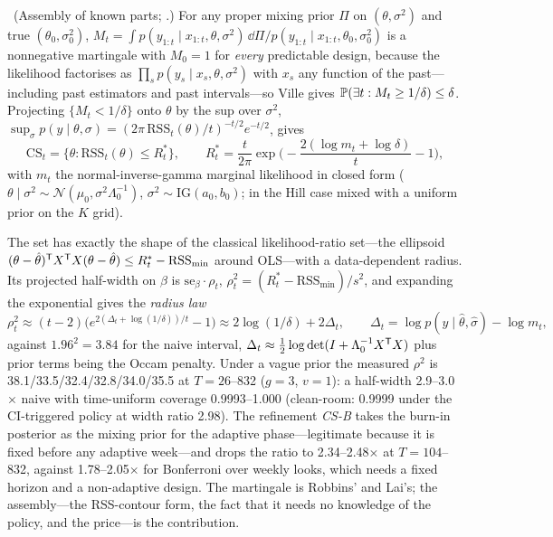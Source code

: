 \begin{construction}
\label{fb:con:cs}
\tagEstablished\ (Assembly of known parts; .) For any proper mixing prior $\Pi$ on $(\theta, \sigma^2)$ and true $(\theta_0, \sigma_0^2)$, $M_t = \int p(y_{1:t} \mid x_{1:t}, \theta, \sigma^2)\,\dd\Pi\big/p(y_{1:t} \mid x_{1:t}, \theta_0, \sigma_0^2)$ is a nonnegative martingale with $M_0 = 1$ for \emph{every} predictable design, because the likelihood factorises as $\prod_s p(y_s \mid x_s, \theta, \sigma^2)$ with $x_s$ any function of the past---including past estimators and past intervals---so Ville gives $\mathbb{P}(\exists t : M_t \ge 1/\delta) \le \delta$. Projecting $\{M_t < 1/\delta\}$ onto $\theta$ by the sup over $\sigma^2$, $\sup_\sigma p(y \mid \theta, \sigma) = (2\pi\,\mathrm{RSS}_t(\theta)/t)^{-t/2}e^{-t/2}$, gives
\begin{equation}
\mathrm{CS}_t = \{\theta : \mathrm{RSS}_t(\theta) \le R^*_t\},\qquad R^*_t = \frac{t}{2\pi}\exp\!\Big(-\frac{2(\log m_t + \log\delta)}{t} - 1\Big),
\label{eq:fb:cs}
\end{equation}
with $m_t$ the normal-inverse-gamma marginal likelihood in closed form ($\theta \mid \sigma^2 \sim \mathcal N(\mu_0, \sigma^2\Lambda_0^{-1})$, $\sigma^2 \sim \mathrm{IG}(a_0, b_0)$; in the Hill case mixed with a uniform prior on the $K$ grid).
\end{construction}

The set has exactly the shape of the classical likelihood-ratio set---the ellipsoid $(\theta - \hat\theta)^{\mathsf{T}} X^{\mathsf{T}} X(\theta - \hat\theta) \le R^*_t - \mathrm{RSS}_{\min}$ around OLS---with a data-dependent radius. Its projected half-width on $\beta$ is $\mathrm{se}_\beta\cdot\rho_t$, $\rho_t^2 = (R^*_t - \mathrm{RSS}_{\min})/s^2$, and expanding the exponential gives the \emph{radius law}
\begin{equation}
\rho_t^2 \approx (t-2)\big(e^{2(\Delta_t + \log(1/\delta))/t} - 1\big) \approx 2\log(1/\delta) + 2\Delta_t,\qquad \Delta_t = \log p(y \mid \hat\theta, \hat\sigma) - \log m_t,
\label{eq:fb:radius}
\end{equation}
against $1.96^2 = 3.84$ for the naive interval, $\Delta_t \approx \tfrac12\log\det(I + \Lambda_0^{-1}X^{\mathsf{T}} X)$ plus prior terms being the Occam penalty. Under a vague prior the measured $\rho^2$ is 38.1/33.5/32.4/32.8/34.0/35.5 at $T = 26$--832 ($g = 3$, $v = 1$): a half-width 2.9--3.0$\times$ naive with time-uniform coverage 0.9993--1.000 (clean-room: 0.9999 under the CI-triggered policy at width ratio 2.98). The refinement \emph{CS-B} takes the burn-in posterior as the mixing prior for the adaptive phase---legitimate because it is fixed before any adaptive week---and drops the ratio to 2.34--2.48$\times$ at $T = 104$--832, against 1.78--2.05$\times$ for Bonferroni over weekly looks, which needs a fixed horizon and a non-adaptive design. The martingale is Robbins' and Lai's; the assembly---the RSS-contour form, the fact that it needs no knowledge of the policy, and the price---is the contribution.

